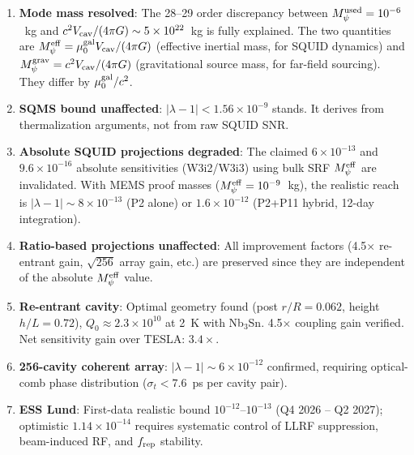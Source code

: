 \documentclass[11pt,twocolumn]{article}
\newcommand{\lam}{\lambda}
\newcommand{\Mpsi}{M_\psi}
\newcommand{\Meff}{M_\psi^{\rm eff}}
\newcommand{\Mgrav}{M_\psi^{\rm grav}}
\newcommand{\ee}[1]{\times 10^{#1}}
\newcommand{\Vcav}{V_{\rm cav}}
\newcommand{\muG}{\mu_0^{\rm gal}}
\begin{document}
\begin{tcolorbox}[colback=blue!5!white, colframe=blue!50!black,
  title=W3i4 P11 Key Conclusions]
\begin{enumerate}[nosep]
\item \textbf{Mode mass resolved}: The 28--29 order discrepancy between
  $\Mpsi^{\rm used} = 10^{-6}$~kg and $c^2\Vcav/(4\pi G) \sim 5\ee{22}$~kg
  is fully explained. The two quantities are $\Meff = \muG\Vcav/(4\pi G)$
  (effective inertial mass, for SQUID dynamics) and
  $\Mgrav = c^2\Vcav/(4\pi G)$ (gravitational source mass, for far-field
  sourcing). They differ by $\muG/c^2$.

\item \textbf{SQMS bound unaffected}: $|\lam-1| < 1.56\ee{-9}$ stands.
  It derives from thermalization arguments, not from raw SQUID SNR.

\item \textbf{Absolute SQUID projections degraded}: The claimed
  $6\ee{-13}$ and $9.6\ee{-16}$ absolute sensitivities (W3i2/W3i3) using
  bulk SRF $\Meff$ are invalidated. With MEMS proof masses ($\Meff =
  10^{-9}$~kg), the realistic reach is $|\lam-1|\sim 8\ee{-13}$ (P2 alone)
  or $1.6\ee{-12}$ (P2+P11 hybrid, 12-day integration).

\item \textbf{Ratio-based projections unaffected}: All improvement factors
  (4.5$\times$ re-entrant gain, $\sqrt{256}$ array gain, etc.) are preserved
  since they are independent of the absolute $\Meff$ value.

\item \textbf{Re-entrant cavity}: Optimal geometry found (post $r/R = 0.062$,
  height $h/L = 0.72$), $Q_0 \approx 2.3\ee{10}$ at 2~K with Nb$_3$Sn.
  4.5$\times$ coupling gain verified. Net sensitivity gain over TESLA: $3.4\times$.

\item \textbf{256-cavity coherent array}: $|\lam-1| \sim 6\ee{-12}$ confirmed,
  requiring optical-comb phase distribution ($\sigma_t < 7.6$~ps per cavity pair).

\item \textbf{ESS Lund}: First-data realistic bound $10^{-12}$--$10^{-13}$
  (Q4 2026 -- Q2 2027); optimistic $1.14\ee{-14}$ requires systematic control
  of LLRF suppression, beam-induced RF, and $f_{\rm rep}$ stability.
\end{enumerate}
\end{tcolorbox}


\end{document}
